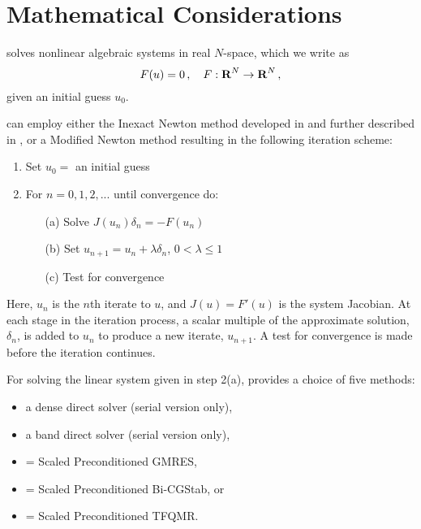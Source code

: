 \chapter{Mathematical Considerations}\label{s:math}

{\kinsol} solves nonlinear algebraic systems in real $N$-space, which
we write as 
\begin{equation}\label{nonlinear_system}
  F(u) = 0 \, , \quad F:\mbox{\bf R}^N \rightarrow \mbox{\bf R}^N \, ,
\end{equation}
given an initial guess $u_0$. 

{\kinsol} can employ either the Inexact Newton method developed in
\cite{Bro:87,BrSa:90,DES:82} and further described in
\cite{DeSc:96,Kel:95}, or a Modified Newton method resulting in the
following iteration scheme:

 \vspace{1ex}
\begin{enumerate}
   \item Set $u_0 = $ an initial guess
   \item For $n = 0, 1, 2,...$ until convergence do:
      \begin{itemize}
          \item[(a)] Solve $J(u_n)\delta_n = -F(u_n)$ \label{e:Newton}
          \item[(b)] Set $u_{n+1} = u_n + \lambda \delta_n$,
          $0 < \lambda \leq 1$
          \item[(c)] Test for convergence
      \end{itemize}
\end{enumerate}
Here, $u_n$ is the $n$th iterate to $u$, and $J(u) = F'(u)$ is the system
Jacobian. At each stage in the iteration process, a scalar multiple of the approximate
solution, $\delta_n$, is added to $u_n$ to produce a new iterate, $u_{n+1}$.
A test for convergence is made before the iteration continues.

For solving the linear system given in step 2(a), {\kinsol} provides
a choice of five methods:
\begin{itemize}
\item a dense direct solver (serial version only),
\item a band direct solver (serial version only),
\item {\spgmr} = Scaled Preconditioned GMRES,
\item {\spbcg} = Scaled Preconditioned Bi-CGStab, or
\item {\sptfqmr} = Scaled Preconditioned TFQMR.
\end{itemize}


